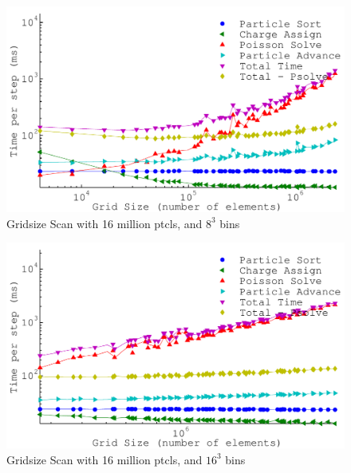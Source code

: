 \begin{figure}[H]
\begin{center}
\includegraphics[width=6in]{performance/gridsize_scan16ptcls8bins.pdf}
\end{center}
\caption{Gridsize Scan with 16 million ptcls, and $8^3$ bins}
\label{fig:grid_scan16ptcls8bins}
\end{figure}

\begin{figure}[H]
\begin{center}
\includegraphics[width=6in]{performance/gridsize_scan16ptcls16bins.pdf}
\end{center}
\caption{Gridsize Scan with 16 million ptcls, and $16^3$ bins}
\label{fig:grid_scan16ptcls16bins}
\end{figure}

